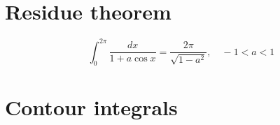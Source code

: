 \documentclass{../note}
\begin{document}
\section{Residue theorem}
\begin{prb}

\end{prb}


\begin{prb}
\[\int_0^{2\pi}\frac{dx}{1+a\cos x}=\frac{2\pi}{\sqrt{1-a^2}},\quad-1<a<1\]
\end{prb}



\section{Contour integrals}
\end{document}
